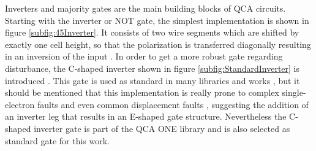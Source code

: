 Inverters and majority gates are the main building blocks of QCA circuits. Starting with the inverter or NOT gate, the simplest implementation is shown in figure \ref{subfig:45Inverter}. It consists of two wire segments which are shifted by exactly one cell height, so that the polarization is transferred diagonally resulting in an inversion of the input \cite{Sasamal2020QuantumDotCA}. In order to get a more robust gate regarding disturbance, the C-shaped inverter shown in figure \ref{subfig:StandardInverter} is introduced \cite{QCA_scl}. This gate is used as standard in many libraries and works \cite{peng2020spars, fontes, sequential_cell_one, USE}, but it should be mentioned that this implementation is really prone to complex single-electron faults \cite{SingelElectronFaults} and even common displacement faults \cite{Inverter_displacements}, suggesting the addition of an inverter leg that results in an E-shaped gate structure. Nevertheless the C-shaped inverter gate is part of the QCA ONE library and is also selected as standard gate for this work.\\
